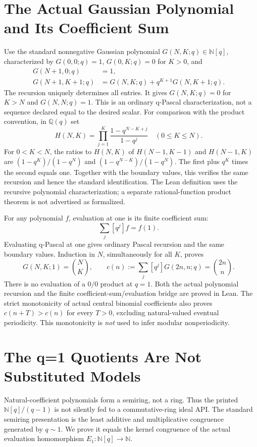\documentclass[11pt]{article}
\newcommand{\N}{\mathbb N}
\begin{document}
\section{The Actual Gaussian Polynomial and Its Coefficient Sum}
Use the standard nonnegative Gaussian polynomial $G(N,K;q)\in\N[q]$,
characterized by $G(0,0;q)=1$, $G(0,K;q)=0$ for $K>0$, and
\begin{align*}
 G(N+1,0;q)&=1,\\
 G(N+1,K+1;q)&=G(N,K;q)+q^{K+1}G(N,K+1;q).
\end{align*}
The recursion uniquely determines all entries. It gives $G(N,K;q)=0$ for
$K>N$ and $G(N,N;q)=1$. This is an ordinary q-Pascal characterization,
not a sequence declared equal to the desired scalar.
For comparison with the product convention, in $\mathbb Q(q)$ set
\[
 H(N,K)=\prod_{j=1}^{K}\frac{1-q^{N-K+j}}{1-q^j}
 \quad(0\le K\le N).
\]
For $0<K<N$, the ratios to $H(N,K)$ of $H(N-1,K-1)$ and
$H(N-1,K)$ are $(1-q^K)/(1-q^N)$ and $(1-q^{N-K})/(1-q^N)$.
The first plus $q^K$ times the second equals one. Together with the boundary
values, this verifies the same recursion and hence the standard identification.
The Lean definition uses the recursive polynomial characterization; a
separate rational-function product theorem is not advertised as formalized.

For any polynomial $f$, evaluation at one is its finite coefficient sum:
\[
 \sum_j [q^j]f=f(1).
\]
Evaluating q-Pascal at one gives ordinary Pascal recursion and the same
boundary values. Induction in $N$, simultaneously for all $K$, proves
\[
 G(N,K;1)=\binom NK,\qquad
 c(n):=\sum_j[q^j]G(2n,n;q)=\binom{2n}{n}.
\]
There is no evaluation of a $0/0$ product at $q=1$. Both the actual
polynomial recursion and the finite coefficient-sum/evaluation bridge are
proved in Lean. The strict monotonicity of actual central binomial
coefficients also proves $c(n+T)>c(n)$ for every $T>0$, excluding
natural-valued eventual periodicity. This monotonicity is \emph{not} used
to infer modular nonperiodicity.

\section{The q=1 Quotients Are Not Substituted Models}
Natural-coefficient polynomials form a semiring, not a ring. Thus the printed
$\N[q]/(q-1)$ is not silently fed to a commutative-ring ideal API.
The standard semiring presentation is the least additive and multiplicative
congruence generated by $q\sim1$. We prove it equals the kernel congruence
of the actual evaluation homomorphism $E_1:\N[q]\to\N$.
\end{document}
